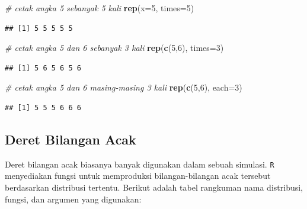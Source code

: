 \documentclass[
]{book}
\newenvironment{Shaded}{\begin{snugshade}}{\end{snugshade}}
\newcommand{\AttributeTok}[1]{\textcolor[rgb]{0.13,0.29,0.53}{#1}}
\newcommand{\CommentTok}[1]{\textcolor[rgb]{0.56,0.35,0.01}{\textit{#1}}}
\newcommand{\DecValTok}[1]{\textcolor[rgb]{0.00,0.00,0.81}{#1}}
\newcommand{\FunctionTok}[1]{\textcolor[rgb]{0.13,0.29,0.53}{\textbf{#1}}}
\newcommand{\NormalTok}[1]{#1}
\theoremstyle{definition}
\theoremstyle{definition}
\theoremstyle{definition}
\theoremstyle{definition}
\theoremstyle{remark}
\begin{document}
\begin{Shaded}
\begin{Highlighting}[]
\CommentTok{\# cetak angka 5 sebanyak 5 kali}
\FunctionTok{rep}\NormalTok{(}\AttributeTok{x=}\DecValTok{5}\NormalTok{, }\AttributeTok{times=}\DecValTok{5}\NormalTok{)}
\end{Highlighting}
\end{Shaded}

\begin{verbatim}
## [1] 5 5 5 5 5
\end{verbatim}

\begin{Shaded}
\begin{Highlighting}[]
\CommentTok{\# cetak angka 5 dan 6 sebanyak 3 kali}
\FunctionTok{rep}\NormalTok{(}\FunctionTok{c}\NormalTok{(}\DecValTok{5}\NormalTok{,}\DecValTok{6}\NormalTok{), }\AttributeTok{times=}\DecValTok{3}\NormalTok{)}
\end{Highlighting}
\end{Shaded}

\begin{verbatim}
## [1] 5 6 5 6 5 6
\end{verbatim}

\begin{Shaded}
\begin{Highlighting}[]
\CommentTok{\# cetak angka 5 dan 6 masing{-}masing 3 kali}
\FunctionTok{rep}\NormalTok{(}\FunctionTok{c}\NormalTok{(}\DecValTok{5}\NormalTok{,}\DecValTok{6}\NormalTok{), }\AttributeTok{each=}\DecValTok{3}\NormalTok{)}
\end{Highlighting}
\end{Shaded}

\begin{verbatim}
## [1] 5 5 5 6 6 6
\end{verbatim}

\hypertarget{randnumb}{%
\subsection{Deret Bilangan Acak}\label{randnumb}}

Deret bilangan acak biasanya banyak digunakan dalam sebuah simulasi. \texttt{R} menyediakan fungsi untuk memproduksi bilangan-bilangan acak tersebut berdasarkan distribusi tertentu. Berikut adalah tabel rangkuman nama distribusi, fungsi, dan argumen yang digunakan:
\end{document}

